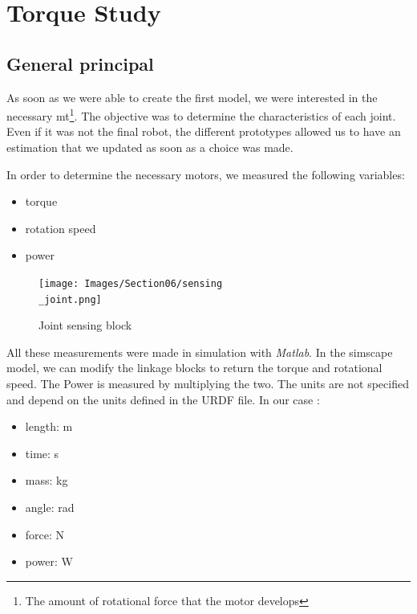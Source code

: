 \section{Torque Study}\insertloftspace
\setcounter{figure}{0}\setcounter{table}{0}

\subsection{General principal}

As soon as we were able to create the first model, we were interested in the necessary \gls{mt}\footnote{The amount of rotational force that the motor develops}. The objective was to determine the characteristics of each joint. Even if it was not the final robot, the different prototypes allowed us to have an estimation that we updated as soon as a choice was made. 

\bigbreak
In order to determine the necessary motors, we measured the following variables:
\begin{multicols}{3}
    \begin{itemize}[noitemsep]
        \item torque
        \item rotation speed
        \item power
    \end{itemize}
\end{multicols}

\bigbreak
\begin{figure}[ht]
    \centering
    \texttt{[image: Images/Section06/sensing\\\_joint.png]}
    \caption{Joint sensing block}
    \label{fig:SensingBlock}
\end{figure}
\FloatBarrier

\bigbreak
All these measurements were made in simulation with \textit{Matlab}. In the simscape model, we can modify the linkage blocks to return the torque and rotational speed. The Power is measured by multiplying the two. The units are not specified and depend on the units defined in the URDF file. In our case : 
\begin{multicols}{2}
    \begin{itemize}[noitemsep]
        \item length: m
        \item time: s
        \item mass: kg
        \item angle: rad
        \item force: N
        \item power: W
    \end{itemize}
\end{multicols}


